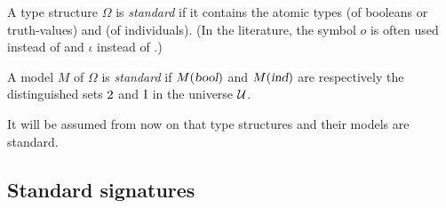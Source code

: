 A type structure $\Omega$ is {\em standard\/} if it contains the
atomic types  (of booleans or truth-values) and  (of
individuals).  (In the literature, the  symbol  $o$ is  often used
instead of   and $\iota$ instead of .)

A model $M$ of $\Omega$ is {\em standard\/} if $M(\textsl{bool})$ and $M(\textsl{ind})$ are
respectively the distinguished sets $\mbox{\rm 2}$ and $\mbox{\rm I}$ in the universe
$\cal U$.

It will be assumed from now on that type structures and their models
are standard.

\subsection{Standard signatures}
\label{standard-signatures}

